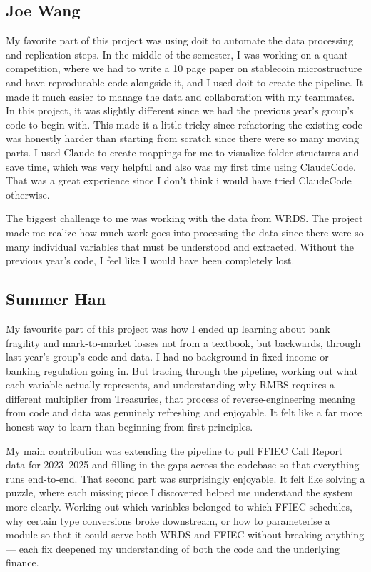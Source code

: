 \documentclass[12pt]{article}
\begin{document}
\subsection{Joe Wang}
My favorite part of this project was using doit to automate the data processing and replication steps.  In the middle of the semester, I was working on a quant competition, where we had
to write a 10 page paper on stablecoin microstructure and have reproducable code alongside it, and I used doit to create the pipeline. It made it much easier to manage the data and 
collaboration with my teammates. In this project, it was slightly different since we had the previous year's group's code to begin with. This made it a little tricky since refactoring the 
existing code was honestly harder than starting from scratch since there were so many moving parts. I used Claude to create mappings for me to visualize folder structures and save time, which was 
very helpful and also was my first time using ClaudeCode. That was a great experience since I don't think i would have tried ClaudeCode otherwise.

The biggest challenge to me was working with the data from WRDS. The project made me realize how much work goes into processing the data since there were so many individual variables that must
be understood and extracted. Without the previous year's code, I feel like I would have been completely lost. 


\subsection{Summer Han}
My favourite part of this project was how I ended up learning about bank fragility and mark-to-market losses not from a textbook, 
but backwards, through last year’s group’s code and data. I had no background in 
fixed income or banking regulation going in. But tracing through the pipeline, 
working out what each variable actually represents, and understanding why RMBS 
requires a different multiplier from Treasuries,  that process of reverse-engineering 
meaning from code and data was genuinely refreshing and enjoyable. It felt like 
a far more honest way to learn than beginning from first principles.

My main contribution was extending the pipeline to pull FFIEC Call Report data 
for 2023–2025 and filling in the gaps across the codebase so that everything 
runs end-to-end. That second part was surprisingly enjoyable. It felt like 
solving a puzzle, where each missing piece I discovered helped me understand 
the system more clearly. Working out which variables belonged to which FFIEC 
schedules, why certain type conversions broke downstream, or how to parameterise 
a module so that it could serve both WRDS and FFIEC without breaking anything 
— each fix deepened my understanding of both the code and the underlying finance. 



\end{document}

